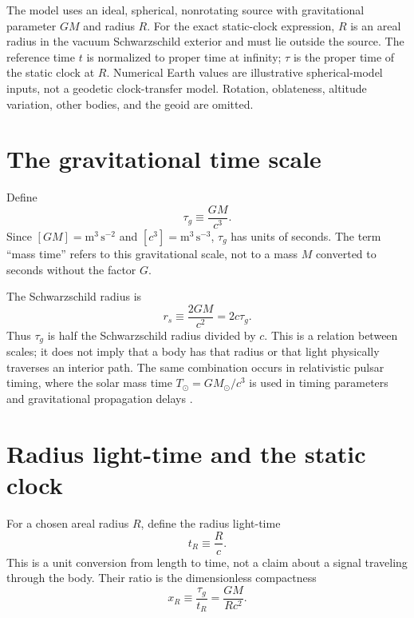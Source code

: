 \documentclass[12pt]{article}
\begin{document}
The model uses an ideal, spherical, nonrotating source with gravitational parameter $GM$ and radius $R$. For the exact static-clock expression, $R$ is an areal radius in the vacuum Schwarzschild exterior and must lie outside the source. The reference time $t$ is normalized to proper time at infinity; $\tau$ is the proper time of the static clock at $R$. Numerical Earth values are illustrative spherical-model inputs, not a geodetic clock-transfer model. Rotation, oblateness, altitude variation, other bodies, and the geoid are omitted.

\section{The gravitational time scale}

Define
\begin{equation}
  \tau_g\equiv\frac{GM}{c^3}.
  \label{eq:mass-time}
\end{equation}
Since $[GM]=\mathrm{m^3\,s^{-2}}$ and $[c^3]=\mathrm{m^3\,s^{-3}}$, $\tau_g$ has units of seconds. The term ``mass time'' refers to this gravitational scale, not to a mass $M$ converted to seconds without the factor $G$.

The Schwarzschild radius is
\begin{equation}
  r_s\equiv\frac{2GM}{c^2}=2c\tau_g.
  \label{eq:schwarzschild-radius}
\end{equation}
Thus $\tau_g$ is half the Schwarzschild radius divided by $c$. This is a relation between scales; it does not imply that a body has that radius or that light physically traverses an interior path. The same combination occurs in relativistic pulsar timing, where the solar mass time $T_{\odot}=GM_{\odot}/c^3$ is used in timing parameters and gravitational propagation delays \cite{Edwards}.

\section{Radius light-time and the static clock}

For a chosen areal radius $R$, define the radius light-time
\begin{equation}
  t_R\equiv\frac{R}{c}.
  \label{eq:radius-time}
\end{equation}
This is a unit conversion from length to time, not a claim about a signal traveling through the body. Their ratio is the dimensionless compactness
\begin{equation}
  x_R\equiv\frac{\tau_g}{t_R}
  =\frac{GM}{Rc^2}.
  \label{eq:compactness}
\end{equation}
\end{document}
